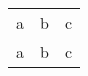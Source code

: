\documentclass{article}
\begin{document}
	
	\begin{tabular}{l l l}
		a & b & c \\
		a & b & c
	\end{tabular}
	
\end{document}
